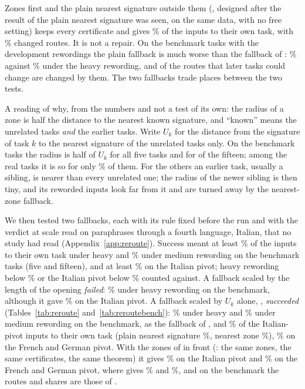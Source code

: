 Zones first and the plain nearest signature outside them (\hybrid{}, designed after the result of the plain nearest signature was seen, on the same data, with no free setting) keeps every certificate and gives \RerouteHybOwnEnd{}\% of the inputs to their own task, with \RerouteHybChanged{}\% changed routes. It is not a repair. On the benchmark tasks with
the development rewordings the plain fallback is much worse than the fallback of \cert{}: \RerouteHybBenchFiveHeavyOwn{}\% against \RerouteCertBenchFiveHeavyOwn{}\% under the heavy rewording, and \RerouteHybBenchFiveHeavyChanged{} of the \RerouteBenchChangeable{} routes
that later tasks could change are changed by them. The two fallbacks trade places between the two tests.

A reading of why, from the numbers and not a test of its own: the radius of a zone is half the distance to the nearest known signature, and ``known'' means the unrelated tasks \emph{and} the earlier tasks. Write $U_k$ for the distance from the signature of task $k$ to the nearest
signature of the unrelated tasks only. On the benchmark tasks the radius is half of $U_k$ for all five tasks and for \RerouteBBenchFifteenCount{} of the fifteen; among the \WidenTasksEval{} real tasks it is so for only \RerouteBShare{}\% of them. For the others an earlier task, usually a
sibling, is nearer than every unrelated one; the radius of the newer sibling is then tiny, and its reworded inputs look far from it and are turned away by the nearest-zone fallback.

We then tested two fallbacks, each with its rule fixed before the run and with the verdict at scale read on paraphrases through a fourth language, Italian, that no study had read (Appendix~\ref{app:reroute}). Success meant at least \RerouteLineHeavy{}\% of the inputs to their own task under
heavy and \RerouteLineMedium{}\% under medium rewording on the benchmark tasks (five and fifteen), and at least \RerouteLineItalian{}\% on the Italian pivot; heavy rewording below \RerouteLineHeavyAgainst{}\% or the Italian pivot below \RerouteLineItalianAgainst{}\% counted against. A fallback scaled by the length of the opening
\emph{failed}: \RerouteNormHeavyFive{}\% under heavy rewording on the benchmark, although it gave \RerouteNormItOwn{}\% on the Italian pivot. A fallback scaled by $U_k$ alone, \scaled{}, \emph{succeeded} (Tables~\ref{tab:reroute} and~\ref{tab:reroutebench}): \RerouteBgHeavyFive{}\% under heavy and \RerouteBgMediumFive{}\% under medium rewording on the benchmark, as
the fallback of \cert{}, and \RerouteBgItOwn{}\% of the Italian-pivot inputs to their own task (plain nearest signature \RerouteSigItOwn{}\%, nearest zone \RerouteNearItOwn{}\%), \RerouteBgOwnEnd{}\% on the French and German pivot. With the zones of \cert{} in front (\certscaled{}: the same zones, the same certificates, the same theorem) it gives
\RerouteCertFourItOwn{}\% on the Italian pivot and \RerouteCertFourOwnEnd{}\% on the French and German pivot, where \cert{} gives \RerouteCertItOwn{}\% and \RerouteCertOwnEnd{}\%, and on the benchmark the routes and shares are those of \cert{}.

